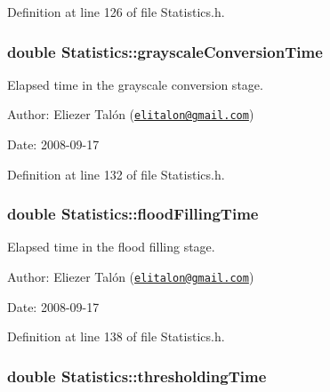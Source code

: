 Definition at line 126 of file Statistics.h.\hypertarget{class_statistics_fc22ca2705714cfc44c45c772475c1cb}{
\subsubsection[grayscaleConversionTime]{\setlength{\rightskip}{0pt plus 5cm}double {\bf Statistics::grayscaleConversionTime}}}
\label{class_statistics_fc22ca2705714cfc44c45c772475c1cb}


Elapsed time in the grayscale conversion stage. 

\begin{Desc}
\item[Author:]Eliezer Talón (\href{mailto:elitalon@gmail.com}{\tt elitalon@gmail.com}) \end{Desc}
\begin{Desc}
\item[Date:]2008-09-17 \end{Desc}


Definition at line 132 of file Statistics.h.\hypertarget{class_statistics_6c2cd48482d1de181cb2dd32b3315449}{
\subsubsection[floodFillingTime]{\setlength{\rightskip}{0pt plus 5cm}double {\bf Statistics::floodFillingTime}}}
\label{class_statistics_6c2cd48482d1de181cb2dd32b3315449}


Elapsed time in the flood filling stage. 

\begin{Desc}
\item[Author:]Eliezer Talón (\href{mailto:elitalon@gmail.com}{\tt elitalon@gmail.com}) \end{Desc}
\begin{Desc}
\item[Date:]2008-09-17 \end{Desc}


Definition at line 138 of file Statistics.h.\hypertarget{class_statistics_e2c88c8b599b217ad3f316cca7a15a23}{
\subsubsection[thresholdingTime]{\setlength{\rightskip}{0pt plus 5cm}double {\bf Statistics::thresholdingTime}}}
\label{class_statistics_e2c88c8b599b217ad3f316cca7a15a23}


